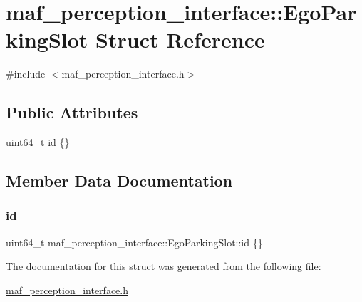 \hypertarget{structmaf__perception__interface_1_1EgoParkingSlot}{}\section{maf\+\_\+perception\+\_\+interface\+:\+:Ego\+Parking\+Slot Struct Reference}
\label{structmaf__perception__interface_1_1EgoParkingSlot}


{\ttfamily \#include $<$maf\+\_\+perception\+\_\+interface.\+h$>$}

\subsection*{Public Attributes}
\begin{DoxyCompactItemize}
\item 
uint64\+\_\+t \hyperlink{structmaf__perception__interface_1_1EgoParkingSlot_acc4bfb3f2189de7c93261516649fbe7e}{id} \{\}
\end{DoxyCompactItemize}


\subsection{Member Data Documentation}
\mbox{\label{structmaf__perception__interface_1_1EgoParkingSlot_acc4bfb3f2189de7c93261516649fbe7e}} 
\subsubsection{\texorpdfstring{id}{id}}
{\footnotesize\ttfamily uint64\+\_\+t maf\+\_\+perception\+\_\+interface\+::\+Ego\+Parking\+Slot\+::id \{\}}



The documentation for this struct was generated from the following file\+:\begin{DoxyCompactItemize}
\item 
\hyperlink{maf__perception__interface_8h}{maf\+\_\+perception\+\_\+interface.\+h}\end{DoxyCompactItemize}
